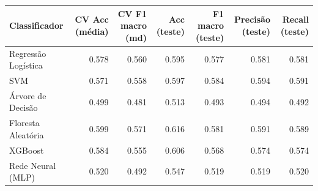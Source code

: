 \begin{tabular}{lrrrrrr}
\toprule
Classificador & CV Acc (média) & CV F1 macro (md) & Acc (teste) & F1 macro (teste) & Precisão (teste) & Recall (teste) \\
\midrule
Regressão Logística & 0.578 & 0.560 & 0.595 & 0.577 & 0.581 & 0.581 \\
SVM & 0.571 & 0.558 & 0.597 & 0.584 & 0.594 & 0.591 \\
Árvore de Decisão & 0.499 & 0.481 & 0.513 & 0.493 & 0.494 & 0.492 \\
Floresta Aleatória & 0.599 & 0.571 & 0.616 & 0.581 & 0.591 & 0.589 \\
XGBoost & 0.584 & 0.555 & 0.606 & 0.568 & 0.574 & 0.574 \\
Rede Neural (MLP) & 0.520 & 0.492 & 0.547 & 0.519 & 0.519 & 0.520 \\
\bottomrule
\end{tabular}
